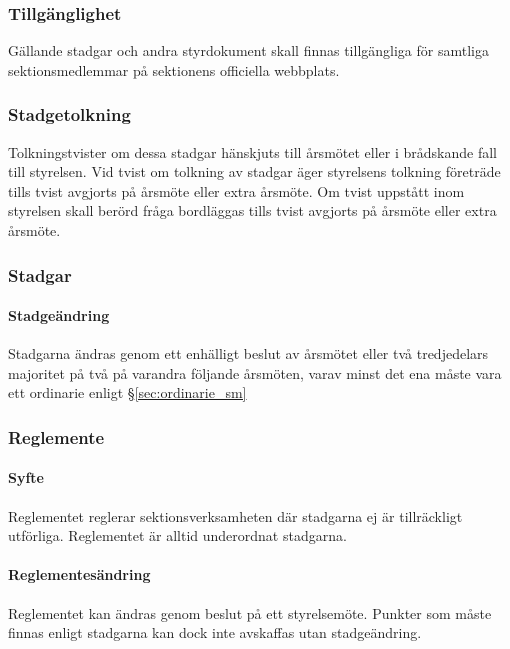 \documentclass{../resources/dgovdoc}
\begin{document}
\subsubsection{Tillgänglighet}

Gällande stadgar och andra styrdokument skall finnas tillgängliga för samtliga
sektionsmedlemmar på sektionens officiella webbplats.

\subsubsection{Stadgetolkning}

Tolkningstvister om dessa stadgar hänskjuts till årsmötet 
eller i brådskande fall till styrelsen. Vid tvist om tolkning av stadgar 
äger styrelsens tolkning företräde tills tvist avgjorts 
på årsmöte eller extra årsmöte. Om tvist uppstått inom 
styrelsen skall berörd fråga bordläggas tills tvist 
avgjorts på årsmöte eller extra årsmöte.

\subsubsection{Stadgar}

\paragraph{Stadgeändring}

Stadgarna ändras genom ett enhälligt beslut av årsmötet eller
två tredjedelars majoritet på två på varandra följande årsmöten, varav
minst det ena måste vara ett ordinarie enligt \S\ref{sec:ordinarie_sm}

\subsubsection{Reglemente}

\paragraph{Syfte}

Reglementet reglerar sektionsverksamheten där stadgarna ej är tillräckligt
utförliga. Reglementet är alltid underordnat stadgarna.

\paragraph{Reglementesändring}

Reglementet kan ändras genom beslut på ett styrelsemöte. Punkter som måste finnas enligt
stadgarna kan dock inte avskaffas utan stadgeändring.
\end{document}
